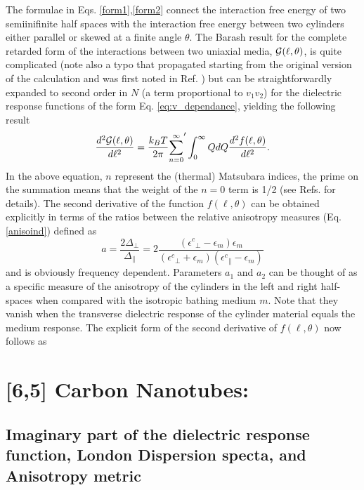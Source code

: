 \documentclass[onecolumn,letterpaper,amsmath,amssymb,floatfix,aps,superscriptaddress]{revtex4}
\begin{document}
The formulae in Eqs. \ref{form1},\ref{form2} connect the interaction free energy of two semiinifinite half spaces with the interaction free energy between two cylinders either 
parallel or skewed at a finite angle $\theta$. The Barash result \cite{Barash} for the complete retarded form of the interactions between two uniaxial media, ${\cal G}(\ell,\theta)$, 
is quite complicated (note also a typo that propagated starting from the original version of the calculation \cite{erratum} and was first noted in Ref. ) but can be straightforwardly expanded to second order 
in $N$ (a term proportional to $v_1 v_2$) for the dielectric response functions of the form Eq. \ref{eq:v_dependance}, yielding the following result
\begin{equation}
\frac{d^{2}{\cal G}(\ell,\theta)}{d\ell^{2}} = \frac{k_BT}{2\pi} {\sum_{n=0}^{\infty}}' \int_0^{\infty} Q dQ \frac{d^{2}f(\ell,\theta)}{d\ell^{2}}.
\end{equation}
In the above equation, $n$ represent the (thermal) Matsubara indices, the prime on the summation means  that the weight of the $n=0$ term is 1/2 (see Refs.  for details). The second derivative of the function $f(\ell,\theta)$ can be obtained explicitly 
in terms of the ratios between the relative anisotropy measures (Eq. \ref{anisoind}) defined as 
\begin{equation}
a = \frac{2 \Delta_{\perp}}{\Delta_{\parallel}} = 2 \frac{({\epsilon^{c}}_{\perp}-\epsilon_{m}) \epsilon_{m}}{({\epsilon^{c}}_{\perp}+\epsilon_{m}) ({\epsilon^{c}}_{\parallel}-\epsilon_{m})}
\label{eq:adef}
\end{equation}
and is obviously frequency dependent. Parameters $a_1$ and $a_2$ can be thought of as a specific measure of the anisotropy of the cylinders in the left and right half-spaces when 
compared with the isotropic bathing medium $m$. Note that they vanish when the transverse dielectric response of the cylinder material equals the medium response. 
The explicit form of the second derivative of $f(\ell,\theta)$ now follows as 

\section{[6,5] Carbon Nanotubes:}
\subsection{Imaginary part of the dielectric response function, London Dispersion
specta, and Anisotropy metric}
\end{document}
